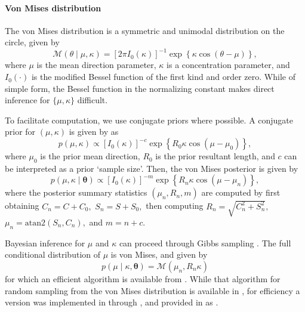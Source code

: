 \hypertarget{von-mises-distribution}{%
\paragraph{Von Mises distribution}\label{von-mises-distribution}}

\label{vonmisespost}

The von Mises distribution is a symmetric and unimodal distribution on
the circle, given by \begin{equation}
\mathcal{M}(\theta \mid \mu, \kappa) = [2 \pi I_0(\kappa)]^{-1} \exp \left\{ \kappa \cos(\theta - \mu) \right\},
\end{equation} where \(\mu\) is the mean direction parameter, \(\kappa\)
is a concentration parameter, and \(I_0(\cdot)\) is the modified Bessel
function of the first kind and order zero. While of simple form, the
Bessel function in the normalizing constant makes direct inference for
\(\{\mu, \kappa\}\) difficult.

To facilitate computation, we use conjugate priors where possible. A
conjugate prior for \((\mu, \kappa)\) is given by
\citet{guttorp1988finding} as
\begin{equation} \label{eqnjss:vmconjprior}
p(\mu, \kappa) \propto [I_0(\kappa)]^{-c}  \exp \left\{ R_0 \kappa \cos(\mu - \mu_0) \right\},
\end{equation} where \(\mu_0\) is the prior mean direction, \(R_0\) is
the prior resultant length, and \(c\) can be interpreted as a prior
`sample size'. Then, the von Mises posterior is given by
\begin{equation}
p(\mu, \kappa \mid \boldsymbol{\theta}) \propto [I_0(\kappa)]^{-m}  \exp \left\{ R_n \kappa \cos(\mu - \mu_n) \right\},
\end{equation} where the posterior summary statistics
\((\mu_n, R_n, m)\) are computed by first obtaining \(C_n = C + C_0,\)
\(S_n = S + S_0,\) then computing \(R_n = \sqrt{C_n^2 + S_n^2},\)
\(\mu_n = \text{atan2}(S_n, C_n),\) and \(m = n + c\).

Bayesian inference for \(\mu\) and \(\kappa\) can proceed through Gibbs
sampling \citep{chib1995understanding}. The full conditional
distribution of \(\mu\) is von Mises, and given by \begin{equation}
p(\mu \mid \kappa, \boldsymbol{\theta}) = \mathcal{M}(\mu_n, R_n \kappa)
\end{equation} for which an efficient algorithm is available from
\citet{best1981bias}. While that algorithm for random sampling from the
von Mises distribution is available in , for efficiency a
version was implemented in  through 
\citep{rcpp}, and provided in  as .

